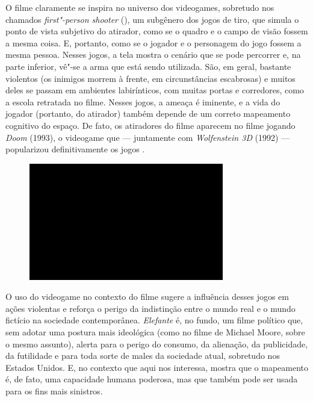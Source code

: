 O filme claramente se inspira no universo dos videogames,
sobretudo nos chamados \emph{first"-person shooter} (), um subgênero
dos jogos de tiro, que simula o ponto de vista subjetivo do atirador,
como se o quadro e o campo de visão fossem a mesma coisa. E, portanto,
como se o jogador e o personagem do jogo fossem a mesma pessoa. Nesses
jogos, a tela mostra o cenário que se pode percorrer e, na parte
inferior, vê"-se a arma que está sendo utilizada. São, em geral, bastante
violentos (os inimigos morrem à frente, em circunstâncias escabrosas) e
muitos deles se passam em ambientes labirínticos, com muitas portas e
corredores, como a escola retratada no filme. Nesses jogos, a ameaça é
iminente, e a vida do jogador (portanto, do atirador) também depende de
um correto mapeamento cognitivo do espaço. De fato, os atiradores do
filme aparecem no filme jogando \emph{Doom} (1993), o videogame que ---
juntamente com \emph{Wolfenstein 3D} (1992) --- popularizou
definitivamente os jogos .

\begin{figure}[!ht]
\centering
 \includegraphics[width=85mm]{./imgs/im1.jpg}
\caption{\tiny{}}
\end{figure}


O uso do videogame no contexto do filme sugere a influência
desses jogos em ações violentas e reforça o perigo da indistinção entre
o mundo real e o mundo fictício na sociedade contemporânea.
\emph{Elefante} é, no fundo, um filme político que, sem adotar uma
postura mais ideológica (como no filme de Michael Moore, sobre o mesmo
assunto), alerta para o perigo do consumo, da alienação, da publicidade,
da futilidade e para toda sorte de males da sociedade atual, sobretudo
nos Estados Unidos. E, no contexto que aqui nos interessa, mostra que o
mapeamento é, de fato, uma capacidade humana poderosa, mas que também
pode ser usada para os fins mais sinistros.

